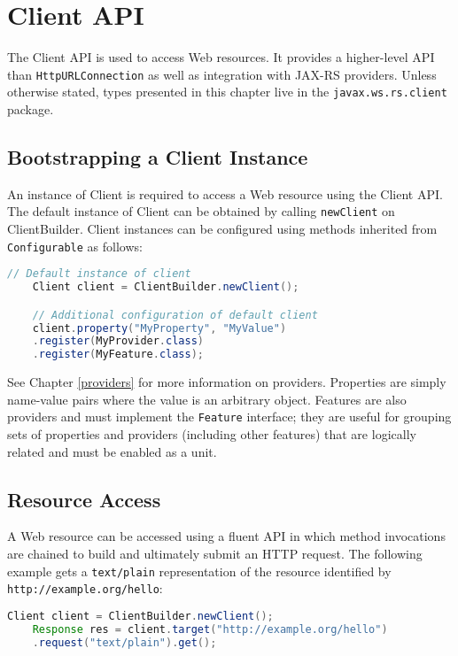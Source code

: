 \chapter{Client API}
\label{client_api}

The Client API is used to access Web resources. It provides a higher-level API than \lstinline{HttpURLConnection} as
well as integration with JAX-RS providers. Unless otherwise stated, types presented in this chapter live in the
\lstinline{javax.ws.rs.client} package.

\section{Bootstrapping a Client Instance}

An instance of Client is required to access a Web resource using the Client API. The default instance of Client can be
obtained by calling \lstinline{newClient} on ClientBuilder. Client instances can be configured using methods inherited
from \lstinline{Configurable} as follows:

\begin{lstlisting}[language=Java]
    // Default instance of client
    Client client = ClientBuilder.newClient();

    // Additional configuration of default client
    client.property("MyProperty", "MyValue")
    .register(MyProvider.class)
    .register(MyFeature.class);
\end{lstlisting}

See Chapter \ref{providers} for more information on providers. Properties are simply name-value pairs where the value is
an arbitrary object. Features are also providers and must implement the \lstinline{Feature} interface; they are useful
for grouping sets of properties and providers (including other features) that are logically related and must be enabled
as a unit.

\section{Resource Access}
\label{resource_access}

A Web resource can be accessed using a fluent API in which method invocations are chained to build and ultimately submit
an HTTP request. The following example gets a \lstinline{text/plain} representation of the resource identified by
\lstinline{http://example.org/hello}:

\begin{lstlisting}[language=Java]
    Client client = ClientBuilder.newClient();
    Response res = client.target("http://example.org/hello")
    .request("text/plain").get();
\end{lstlisting}

